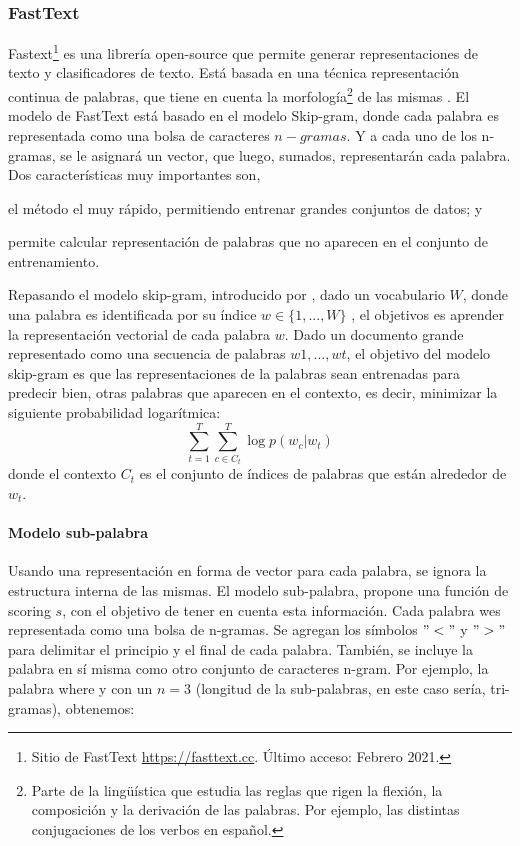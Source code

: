 \subsubsection{FastText}
Fastext\footnote{Sitio de FastText \url{https://fasttext.cc}. Último acceso: Febrero 2021.} es una librería open-source que permite generar representaciones de texto y clasificadores de texto. Está basada en una técnica representación continua de palabras, que tiene en cuenta la morfología\footnote{Parte de la lingüística que estudia las reglas que rigen la flexión, la composición y la derivación de las palabras. Por ejemplo, las distintas conjugaciones de los verbos en español.} de las mismas \citep{bojanowski2017enriching}. 
El modelo de FastText está basado en el modelo Skip-gram, donde cada palabra es representada como una bolsa de caracteres \(n-gramas\). Y a cada uno de los n-gramas, se le asignará un vector, que luego, sumados, representarán cada palabra. Dos características muy importantes son, \begin{enumerate*} [label=(\roman*)] \item el método el muy rápido, permitiendo entrenar grandes conjuntos de datos; y \item permite calcular representación de palabras que no aparecen en el conjunto de entrenamiento.  \end{enumerate*} 

\bigskip Repasando el modelo skip-gram, introducido por \cite{mikolov2013efficient}, dado un vocabulario \(W\), donde una palabra es identificada por su índice \(w \in \{1,... , W\}\) , el objetivos es aprender la representación vectorial de cada palabra \(w\). Dado un documento grande representado como una secuencia de palabras \(w1, ..., wt\), el objetivo del modelo skip-gram es que las representaciones de la palabras sean entrenadas para predecir bien, otras palabras que aparecen en el contexto, es decir, minimizar la siguiente probabilidad logarítmica:
\[\sum_{t=1}^{T}\sum_{c \in C_t}^{T}{\log p(w_c | w_t)}\]
donde el contexto \(C_t\) es el conjunto de índices de palabras que están alrededor de \(w_t\).

\paragraph{Modelo sub-palabra}
Usando una representación en forma de vector para cada palabra, se ignora la estructura interna de las mismas. El modelo sub-palabra, propone una función de scoring \(s\), con el objetivo de tener en cuenta esta información.
Cada palabra wes representada como una bolsa de n-gramas. Se agregan los símbolos \("<"\) y \(">"\) para delimitar el principio y el final de cada palabra. También, se incluye la palabra en sí misma como otro conjunto de caracteres n-gram. Por ejemplo, la palabra where y con un \(n = 3 \) (longitud de la sub-palabras, en este caso sería, tri-gramas), obtenemos:

